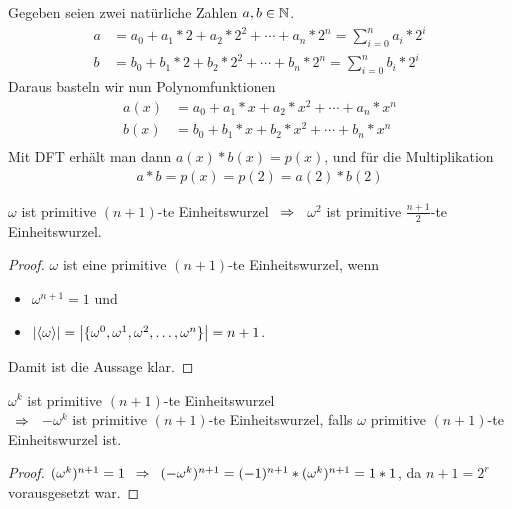 \begin{bem}
	Gegeben seien zwei natürliche Zahlen $a, b \in \mathbb{N}$.
	\begin{align*}
		a &= a_0 + a_1 * 2 + a_2 * 2^2 + \cdots + a_n * 2^n = \sum_{i=0}^n{a_i*2^i} \\
		b &= b_0 + b_1 * 2 + b_2 * 2^2 + \cdots + b_n * 2^n = \sum_{i=0}^n{b_i*2^i}
	\end{align*}
	Daraus basteln wir nun Polynomfunktionen 
	\begin{align*}
		a(x) &= a_0 + a_1 * x + a_2 * x^2 + \cdots + a_n*x^n \\
		b(x) &= b_0 + b_1 * x + b_2 * x^2 + \cdots + b_n*x^n \\
	\end{align*}
	Mit DFT erhält man dann $a(x) * b(x) = p(x)$, und für die Multiplikation
	\begin{align*}
		a*b = p(x) = p(2) = a(2) * b(2)
	\end{align*}
\end{bem}

\begin{bem}
	$\omega$ ist primitive $(n+1)$-te Einheitswurzel $\enspace \Rightarrow \enspace$ $\omega^2$ ist primitive $\frac{n+1}{2}$-te Einheitswurzel.
\end{bem}
\begin{proof}
	$\omega$ ist eine primitive $(n+1)$-te Einheitswurzel, wenn
	\begin{itemize}
		\item $\omega^{n+1} = 1$ und
		\item $\left| \langle \omega \rangle \right| = \left| \{ \omega^0, \omega^1, \omega^2, \dots, \omega^n \} \right| = n+1$.
	\end{itemize}
	Damit ist die Aussage klar.
\end{proof}
\begin{bem}
	$\omega^k$ ist primitive $(n+1)$-te Einheitswurzel \\
	$\enspace \Rightarrow \enspace$ $-\omega^k$ ist primitive $(n+1)$-te Einheitswurzel, falls $\omega$ primitive $(n+1)$-te Einheitswurzel ist.
\end{bem}
\begin{proof}
	$(\omega^k)^{n+1} = 1 \enspace \Rightarrow \enspace (-\omega^k)^{n+1} = (-1)^{n+1} * (\omega^k)^{n+1} = 1 * 1$, da $n+1 = 2^r$ vorausgesetzt war.
\end{proof}

